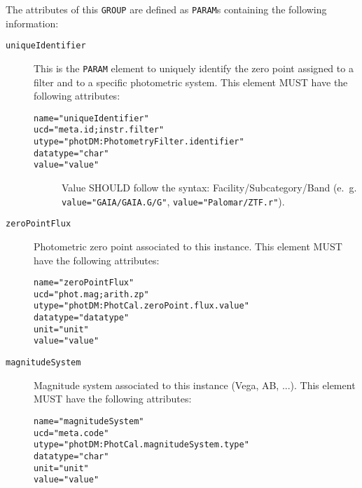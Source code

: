 \documentclass[11pt,a4paper]{ivoa}
\let\fg=\color
\def\elem#1{{\tt{\fg{DarkRed}#1}}}
\def\attrval#1#2{{\tt{\fg{DarkRed}#1}="{\fg{DarkPurple}#2}"}}
\begin{document}
The attributes of this \elem{GROUP} are defined as \elem{PARAM}s containing the following information: 
\begin{description}
\item[\elem{uniqueIdentifier}] This is the \elem{PARAM} element to uniquely identify the zero point assigned to a filter and to a specific photometric system. This element MUST have the following attributes:
\begin{description}
    \item[\attrval{name}{uniqueIdentifier}]
    \item[\attrval{ucd}{meta.id;instr.filter}]
    \item[\attrval{utype}{photDM:PhotometryFilter.identifier}]
    \item[\attrval{datatype}{char}]
    \item[\attrval{value}{value}] Value SHOULD follow the syntax: Facility/Subcategory/Band (e.~g. \attrval{value}{GAIA/GAIA.G/G}, \attrval{value}{Palomar/ZTF.r}). 
\end{description}
\item[\elem{zeroPointFlux}] Photometric zero point associated to this instance. This element MUST have the following attributes:
\begin{description}
    \item[\attrval{name}{zeroPointFlux}]
    \item[\attrval{ucd}{phot.mag;arith.zp}]
    \item[\attrval{utype}{photDM:PhotCal.zeroPoint.flux.value}]
    \item[\attrval{datatype}{datatype}]
    \item[\attrval{unit}{unit}]
    \item[\attrval{value}{value}]
\end{description}
\item[\elem{magnitudeSystem}] Magnitude system associated to this instance (Vega, AB, ...). This element MUST have the following attributes:
\begin{description}
    \item[\attrval{name}{magnitudeSystem}]
    \item[\attrval{ucd}{meta.code}] 
    \item[\attrval{utype}{photDM:PhotCal.magnitudeSystem.type}]
    \item[\attrval{datatype}{char}]
    \item[\attrval{unit}{unit}]
    \item[\attrval{value}{value}]
\end{description}

\end{description}
\end{document}
